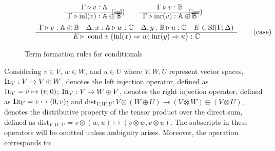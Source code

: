 \begin{figure} [H]
\begin{equation*}
\begin{split}
\begin{aligned}
& \hspace{55pt}
\begin{minipage}[t]{0.3\textwidth}
$\begin{array}{c}
     \Gamma \triangleright v: \mathbb{A} \\
    \hline
   \Gamma \triangleright \text{inl}(v):  \mathbb{A} \oplus \mathbb{B}
\end{array}
$
\end{minipage}
\hspace{-38pt}
\text{(inl)} 
 \hspace{20pt}
\begin{minipage}[t]{0.3\textwidth}
$\begin{array}{c}
      \Gamma \triangleright v:  \mathbb{B} \\
    \hline
   \Gamma \triangleright \text{inr}(v): \mathbb{A} \oplus \mathbb{B}
\end{array}
$ \end{minipage} 
\hspace{-35pt} \text{(inr)} \\
&\hspace{15pt}
\begin{minipage}[t]{0.3\textwidth}
$\begin{array}{c}
     \Gamma\triangleright v: \mathbb{A} \oplus \mathbb{B} \quad \Delta, x: \mathbb{A} \triangleright w: \mathbb{C} \quad \Delta, y: \mathbb{B}  \triangleright u : \mathbb{C}   \quad E \in \text{Sf}(\Gamma;\Delta)  \\
    \hline
   E \triangleright \text{ cond } v \hspace{2pt} \{\text{inl} (x) \Rightarrow w ; \hspace{1pt} \text{inr} (y) \Rightarrow u\}: \mathbb{C} 
\end{array}
$
\end{minipage}
\hspace{200pt}
\text{(case)} 
\end{aligned}
\end{split}
\end{equation*}
\caption{Term formation rules for conditionals}
\label{fig:typing_rules_cond}
\end{figure}
Considering  $v \in V$, $w \in W$, and $u \in U$ where $V, W, U$ represent vector spaces, $\textsc{Il}_{V}: V \xrightarrow{} V\oplus W$, denotes the left injection operator, defined as $\textsc{Il}_{V}= v \mapsto (v,0) $; $\textsc{Ir}_{V}: V \xrightarrow{} W \oplus V$, denotes the right injection operator, defined as $\textsc{Ir}_{V}= v \mapsto (0,v) $; and $\text{dist}_{V, W,U}: V \otimes  \left(W \oplus U\right) \xrightarrow{} \left(V \otimes W\right) \oplus \left(V \otimes U\right)$, denotes the distributive property of the tensor product over the direct sum, defined as $\text{dist}_{V, W,U} =  v \otimes  \left(w, u\right) \mapsto \left(v \otimes w, v \otimes u\right)$. The subscripts in these operators will be omitted unless ambiguity arises. Moreover, the operation  corresponds to:
